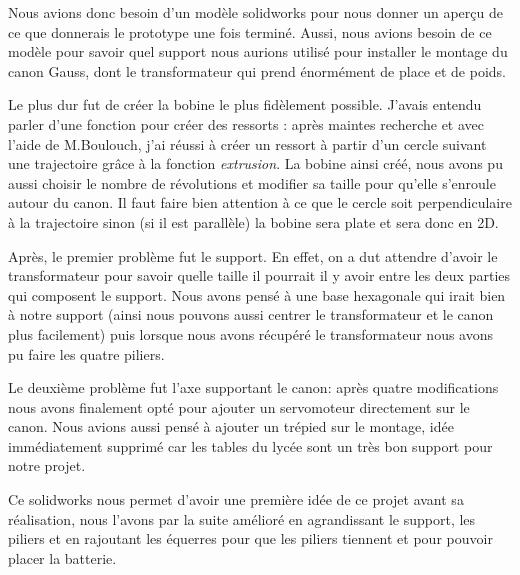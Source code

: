 Nous avions donc besoin d'un modèle solidworks pour nous donner un aperçu de ce que donnerais le prototype une fois terminé. Aussi, nous avions besoin de ce modèle pour savoir quel support nous aurions utilisé pour installer le montage du canon Gauss, dont le transformateur qui prend énormément de place et de poids.

Le plus dur fut de créer la bobine le plus fidèlement possible. J'avais entendu parler d'une fonction pour créer des ressorts : après maintes recherche et avec l'aide de M.Boulouch, j'ai réussi à créer un ressort à partir d'un cercle suivant une trajectoire grâce à la fonction \emph{extrusion}. La bobine ainsi créé, nous avons pu aussi choisir le nombre de révolutions et modifier sa taille pour qu'elle s'enroule autour du canon. Il faut faire bien attention à ce que le cercle soit perpendiculaire à la trajectoire sinon (si il est parallèle) la bobine sera plate et sera donc en 2D. 

Après, le premier problème fut le support. En effet, on a dut attendre d'avoir le transformateur pour savoir quelle taille il pourrait il y avoir entre les deux parties qui composent le support. Nous avons pensé à une base hexagonale qui irait bien à notre support (ainsi nous pouvons aussi centrer le transformateur et le canon plus facilement) puis lorsque nous avons récupéré le transformateur nous avons pu faire les quatre piliers.

Le deuxième problème fut l'axe supportant le canon: après quatre modifications nous avons finalement opté pour ajouter un servomoteur directement sur le canon. Nous avions aussi pensé à ajouter un trépied sur le montage, idée immédiatement supprimé car les tables du lycée sont un très bon support pour notre projet.

Ce solidworks nous permet d'avoir une première idée de ce projet avant sa réalisation, nous l'avons par la suite amélioré en agrandissant le support, les piliers et en rajoutant les équerres pour que les piliers tiennent et pour pouvoir placer la batterie. 

